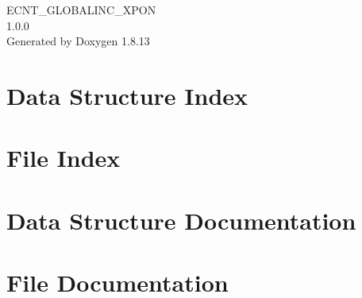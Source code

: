 \documentclass[twoside]{book}
\newcommand{\+}{\discretionary{\mbox{\scriptsize$\hookleftarrow$}}{}{}}
\newcommand{\clearemptydoublepage}{%
  \newpage{\pagestyle{empty}\cleardoublepage}%
}
\begin{document}
\hypersetup{pageanchor=false,
             bookmarksnumbered=true,
             pdfencoding=unicode
            }
\begin{titlepage}
\vspace*{7cm}
\begin{center}%
{\Large E\+C\+N\+T\+\_\+\+G\+L\+O\+B\+A\+L\+I\+N\+C\+\_\+\+X\+P\+ON \\[1ex]\large 1.\+0.\+0 }\\
\vspace*{1cm}
{\large Generated by Doxygen 1.8.13}\\
\end{center}
\end{titlepage}
\clearemptydoublepage
{}
\tableofcontents
\clearemptydoublepage
{}
\hypersetup{pageanchor=true}

\chapter{Data Structure Index}

\chapter{File Index}

\chapter{Data Structure Documentation}

























\chapter{File Documentation}












\backmatter
\newpage
{}
\clearemptydoublepage
{}
\printindex
\end{document}
